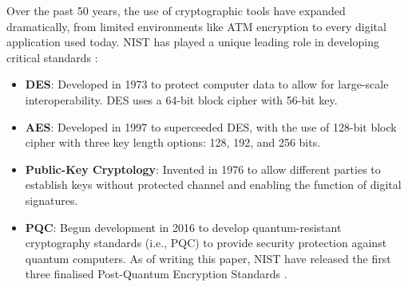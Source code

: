 Over the past 50 years, the use of cryptographic tools have expanded dramatically, from limited environments like \gls{ATM} encryption to every digital application used today. 
\Gls{NIST} has played a unique leading role in developing critical standards \cite{chen2022cornerstone}:
\begin{itemize}
    \item \textbf{\Gls{DES}}: Developed in 1973 to protect computer data to allow for large-scale interoperability. \Gls{DES} uses a 64-bit block cipher with 56-bit key.
    \item \textbf{\Gls{AES}}: Developed in 1997 to superceeded \gls{DES}, with the use of 128-bit block cipher with three key length options: 128, 192, and 256 bits. 
    \item \textbf{Public-Key Cryptology}: Invented in 1976 to allow different parties to establish keys without protected channel and enabling the function of digital signatures. 
    \item \textbf{\Gls{PQC}}: Begun development in 2016 to develop quantum-resistant cryptography standards (i.e., \gls{PQC}) to provide security protection against quantum computers. As of writing this paper, \gls{NIST} have released the first three finalised Post-Quantum Encryption Standards \cite{nist2024postquantum}.
\end{itemize}

